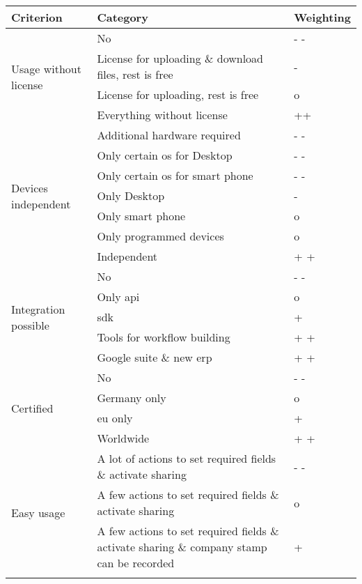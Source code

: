 \begin{table}[h!]
	\begin{tabular}{|p{4cm}|p{9cm}|p{1.5cm}|} \hline
		Criterion & Category & Weighting \\ \hline
		\multirow{4}{*}{Usage without license} & No & - - \\ \cline{2-3}
														& License for uploading \& download files, rest is free & - \\ \cline{2-3}
														& License for uploading, rest is free & o \\ \cline{2-3}
														& Everything without license & ++ \\ \hline
		\multirow{7}{*}{Devices independent} & Additional hardware required & - - \\ \cline{2-3}
											 & Only certain \gls{os} for Desktop & - - \\ \cline{2-3}
											 & Only certain \gls{os} for smart phone & - - \\ \cline{2-3} 
											 & Only Desktop & - \\ \cline{2-3}
											 & Only smart phone & o \\ \cline{2-3}
											 & Only programmed devices & o \\ \cline{2-3}
											 & Independent & + + \\ \hline
		\multirow{5}{*}{Integration possible} & No & - - \\ \cline{2-3}
												& Only \gls{api} & o\\ \cline{2-3}
												& \Gls{sdk} & + \\ \cline{2-3}
												& Tools for workflow building & + + \\ \cline{2-3}
												& Google suite \& new \gls{erp} & + + \\ \hline
		\multirow{4}{*}{Certified} & No & - - \\ \cline{2-3}
									& Germany only & o \\ \cline{2-3}
									& \Gls{eu} only & + \\ \cline{2-3}
									& Worldwide & + + \\ \hline
		\multirow{4}{*}{Easy usage} & A lot of actions to set required fields \& activate sharing & - - \\ \cline{2-3}
									& A few actions to set required fields \& activate sharing & o \\ \cline{2-3}
									& A few actions to set required fields \& activate sharing \& company stamp can be recorded & + \\ \cline{2-3}

\end{tabular}
\end{table}
